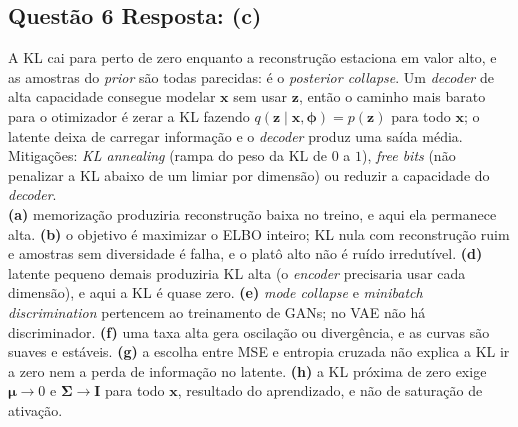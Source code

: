 \documentclass[11pt,a4paper]{article}
\begin{document}
\subsection*{Questão 6 \textemdash{} Resposta: (c)}
A KL cai para perto de zero enquanto a reconstrução estaciona em valor alto, e as amostras do \textit{prior} são todas parecidas: é o \textit{posterior collapse}. Um \textit{decoder} de alta capacidade consegue modelar $\mathbf{x}$ sem usar $\mathbf{z}$, então o caminho mais barato para o otimizador é zerar a KL fazendo $q(\mathbf{z}\mid\mathbf{x},\boldsymbol{\phi}) = p(\mathbf{z})$ para todo $\mathbf{x}$; o latente deixa de carregar informação e o \textit{decoder} produz uma saída média. Mitigações: \textit{KL annealing} (rampa do peso da KL de $0$ a $1$), \textit{free bits} (não penalizar a KL abaixo de um limiar por dimensão) ou reduzir a capacidade do \textit{decoder}.\\
\textbf{(a)} memorização produziria reconstrução baixa no treino, e aqui ela permanece alta.
\textbf{(b)} o objetivo é maximizar o ELBO inteiro; KL nula com reconstrução ruim e amostras sem diversidade é falha, e o platô alto não é ruído irredutível.
\textbf{(d)} latente pequeno demais produziria KL alta (o \textit{encoder} precisaria usar cada dimensão), e aqui a KL é quase zero.
\textbf{(e)} \textit{mode collapse} e \textit{minibatch discrimination} pertencem ao treinamento de GANs; no VAE não há discriminador.
\textbf{(f)} uma taxa alta gera oscilação ou divergência, e as curvas são suaves e estáveis.
\textbf{(g)} a escolha entre MSE e entropia cruzada não explica a KL ir a zero nem a perda de informação no latente.
\textbf{(h)} a KL próxima de zero exige $\boldsymbol{\mu} \to 0$ e $\boldsymbol{\Sigma} \to \mathbf{I}$ para todo $\mathbf{x}$, resultado do aprendizado, e não de saturação de ativação.
\end{document}
